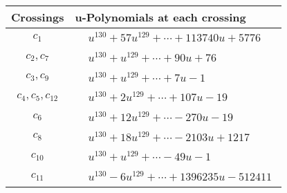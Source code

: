 \documentclass[1p]{elsarticle_modified}
\theoremstyle{definition}
\begin{document}
\begin{tabular}{m{50pt}|m{274pt}}
Crossings & \hspace{64pt}u-Polynomials at each crossing \\
\hline $$\begin{aligned}c_{1}\end{aligned}$$&$\begin{aligned}
&u^{130}+57 u^{129}+\cdots+113740 u+5776
\end{aligned}$\\
\hline $$\begin{aligned}c_{2},c_{7}\end{aligned}$$&$\begin{aligned}
&u^{130}+u^{129}+\cdots+90 u+76
\end{aligned}$\\
\hline $$\begin{aligned}c_{3},c_{9}\end{aligned}$$&$\begin{aligned}
&u^{130}+u^{129}+\cdots+7 u-1
\end{aligned}$\\
\hline $$\begin{aligned}c_{4},c_{5},c_{12}\end{aligned}$$&$\begin{aligned}
&u^{130}+2 u^{129}+\cdots+107 u-19
\end{aligned}$\\
\hline $$\begin{aligned}c_{6}\end{aligned}$$&$\begin{aligned}
&u^{130}+12 u^{129}+\cdots-270 u-19
\end{aligned}$\\
\hline $$\begin{aligned}c_{8}\end{aligned}$$&$\begin{aligned}
&u^{130}+18 u^{129}+\cdots-2103 u+1217
\end{aligned}$\\
\hline $$\begin{aligned}c_{10}\end{aligned}$$&$\begin{aligned}
&u^{130}+u^{129}+\cdots-49 u-1
\end{aligned}$\\
\hline $$\begin{aligned}c_{11}\end{aligned}$$&$\begin{aligned}
&u^{130}-6 u^{129}+\cdots+1396235 u-512411
\end{aligned}$\\
\hline
\end{tabular}\\~\\
\end{document}
